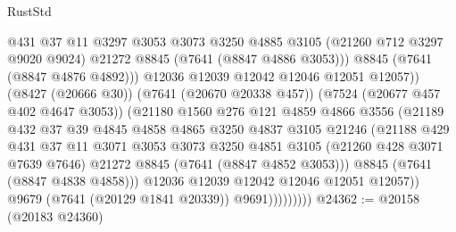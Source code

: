 \begin{lexlean}{RustStd}
\begin{coremodule}
{\begin{coremodule}
{{{{{{{{{{{{{{{{{{{{{{{{{{{{{{{{                                @431
                                @37
                                @11
                                @3297
                                @3053
                                @3073
                                @3250
                                @4885
                                @3105
                                (@21260 @712 @3297 @9020 @9024)
                                @21272
                                @8845
                                (@7641 (@8847 @4886 @3053)))
                              @8845
                              (@7641 (@8847 @4876 @4892)))
                            @12036
                            @12039
                            @12042
                            @12046
                            @12051
                            @12057))
                        (@8427 (@20666 @30))
                        (@7641 (@20670 @20338 @457))
                        (@7524 (@20677 @457 @402 @4647 @3053))
                        (@21180
                          @1560
                          @276
                          @121
                          @4859
                          @4866
                          @3556
                          (@21189
                            @432
                            @37
                            @39
                            @4845
                            @4858
                            @4865
                            @3250
                            @4837
                            @3105
                            @21246
                            (@21188
                              @429
                              @431
                              @37
                              @11
                              @3071
                              @3053
                              @3073
                              @3250
                              @4851
                              @3105
                              (@21260 @428 @3071 @7639 @7646)
                              @21272
                              @8845
                              (@7641 (@8847 @4852 @3053)))
                            @8845
                            (@7641 (@8847 @4838 @4858)))
                          @12036
                          @12039
                          @12042
                          @12046
                          @12051
                          @12057))
                      @9679
                      (@7641 (@20129 @1841 @20339))
                      @9691)))))))))
@24362 := @20158 (@20183 @24360)
}}}}}}}}}}}}}}}}}}}}}}}}}}}}}}}}
\end{coremodule}}
\end{coremodule}
\end{lexlean}
